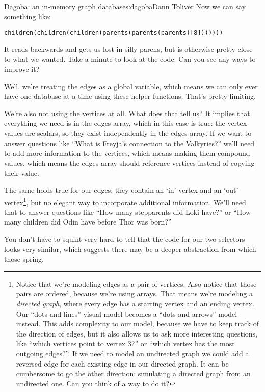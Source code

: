 \begin{aosachapter}{Dagoba: an in-memory graph database}{s:dagoba}{Dann Toliver}
Now we can say something like:

\begin{verbatim}
children(children(children(parents(parents(parents([8]))))))
\end{verbatim}

It reads backwards and gets us lost in silly parens, but is otherwise
pretty close to what we wanted. Take a minute to look at the code. Can
you see any ways to improve it?

Well, we're treating the edges as a global variable, which means we can
only ever have one database at a time using these helper functions.
That's pretty limiting.

We're also not using the vertices at all. What does that tell us? It
implies that everything we need is in the edges array, which in this
case is true: the vertex values are scalars, so they exist independently
in the edges array. If we want to answer questions like ``What is
Freyja's connection to the Valkyries?'' we'll need to add more
information to the vertices, which means making them compound values,
which means the edges array should reference vertices instead of copying
their value.

The same holds true for our edges: they contain an `in' vertex and an
`out' vertex\footnote{Notice that we're modeling edges as a pair of
  vertices. Also notice that those pairs are ordered, because we're
  using arrays. That means we're modeling a \emph{directed graph}, where
  every edge has a starting vertex and an ending vertex. Our ``dots and
  lines'' visual model becomes a ``dots and arrows'' model instead. This
  adds complexity to our model, because we have to keep track of the
  direction of edges, but it also allows us to ask more interesting
  questions, like ``which vertices point to vertex 3?'' or ``which
  vertex has the most outgoing edges?''. If we need to model an
  undirected graph we could add a reversed edge for each existing edge
  in our directed graph. It can be cumbersome to go the other direction:
  simulating a directed graph from an undirected one. Can you think of a
  way to do it?}, but no elegant way to incorporate additional
information. We'll need that to answer questions like ``How many
stepparents did Loki have?'' or ``How many children did Odin have before
Thor was born?''

You don't have to squint very hard to tell that the code for our two
selectors looks very similar, which suggests there may be a deeper
abstraction from which those spring.


\end{aosachapter}
